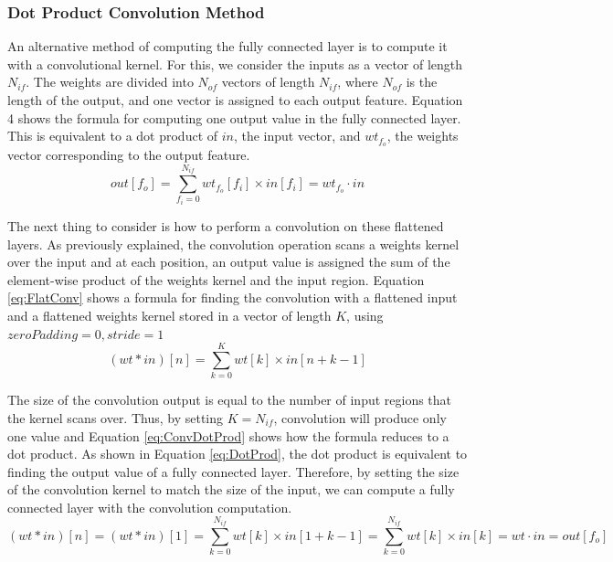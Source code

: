 \documentclass[12pt]{article}
\begin{document}
\subsubsection{Dot Product Convolution Method}
\label{sec:Design-FC-Conv}

An alternative method of computing the fully connected layer is to compute it with a convolutional kernel. For this, we consider the inputs as a vector of length $N_{if}$. The weights are divided into $N_{of}$ vectors of length $N_{if}$, where $N_{of}$ is the length of the output, and one vector is assigned to each output feature. Equation 4 shows the formula for computing one output value in the fully connected layer. This is equivalent to a dot product of $in$, the input vector, and $wt_{f_o}$, the weights vector corresponding to the output feature. 
\begin{equation}
out[f_o] = \sum^{N_{if}}_{f_i=0} wt_{f_o}[f_i]\times in[f_i] = wt_{f_o} \cdot in
\label{eq:DotProd}
\end{equation}

The next thing to consider is how to perform a convolution on these flattened layers. As previously explained, the convolution operation scans a weights kernel over the input and at each position, an output value is assigned the sum of the element-wise product of the weights kernel and the input region. Equation \ref{eq:FlatConv} shows a formula for finding the convolution with a flattened input and a flattened weights kernel stored in a vector of length $K$, using $zeroPadding = 0, stride =1$
\begin{equation}
(wt*in)[n] = \sum^{K}_{k=0} wt[k]\times in[n + k - 1]
\label{eq:FlatConv}
\end{equation}

The size of the convolution output is equal to the number of input regions that the kernel scans over. Thus, by setting $K = N_{if}$, convolution will produce only one value and Equation \ref{eq:ConvDotProd} shows how the formula reduces to a dot product\cite{fc2conv}. As shown in Equation \ref{eq:DotProd}, the dot product is equivalent to finding the output value of a fully connected layer. Therefore, by setting the size of the convolution kernel to match the size of the input, we can compute a fully connected layer with the convolution computation.
\begin{equation}
(wt*in)[n] = (wt*in)[1] = \sum^{N_{if}}_{k=0} wt[k]\times in[1 + k - 1] 
= \sum^{N_{if}}_{k=0} wt[k]\times in[k] = wt \cdot in = out[f_o]
\label{eq:ConvDotProd}
\end{equation}
\end{document}
